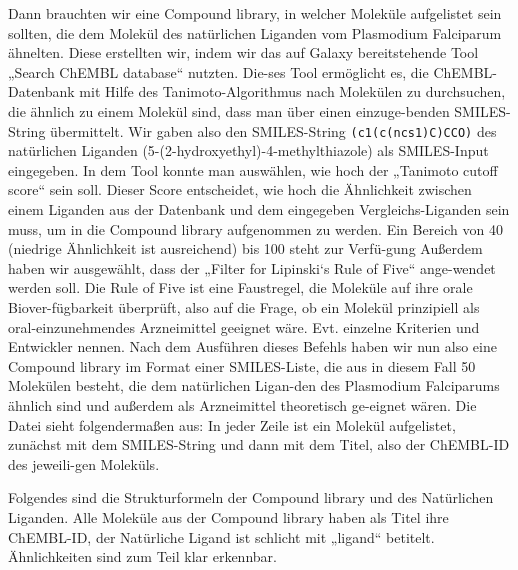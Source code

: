 \documentclass[11pt]{article}
\begin{document}
{    Dann brauchten wir eine Compound library, in welcher Moleküle aufgelistet sein sollten, die dem Molekül des natürlichen Liganden vom Plasmodium Falciparum ähnelten. Diese erstellten wir, indem wir das auf Galaxy bereitstehende Tool „Search ChEMBL database“ nutzten. Die-ses Tool ermöglicht es, die ChEMBL-Datenbank mit Hilfe des Tanimoto-Algorithmus nach Molekülen zu durchsuchen, die ähnlich zu einem Molekül sind, dass man über einen einzuge-benden SMILES-String übermittelt. Wir gaben also den SMILES-String \texttt{(c1(c(ncs1)C)CCO)} des natürlichen Liganden (5-(2-hydroxyethyl)-4-methylthiazole) als SMILES-Input eingegeben.
    In dem Tool konnte man auswählen, wie hoch der „Tanimoto cutoff score“ sein soll. Dieser Score entscheidet, wie hoch die Ähnlichkeit zwischen einem Liganden aus der Datenbank und dem eingegeben Vergleichs-Liganden sein muss, um in die Compound library aufgenommen zu werden. Ein Bereich von 40 (niedrige Ähnlichkeit ist ausreichend) bis 100 steht zur Verfü-gung Außerdem haben wir ausgewählt, dass der „Filter for Lipinski‘s Rule of Five“ ange-wendet werden soll. Die Rule of Five ist eine Faustregel, die Moleküle auf ihre orale Biover-fügbarkeit überprüft, also auf die Frage, ob ein Molekül prinzipiell als oral-einzunehmendes Arzneimittel geeignet wäre.
    Evt. einzelne Kriterien und Entwickler nennen.
    Nach dem Ausführen dieses Befehls haben wir nun also eine Compound library im Format einer SMILES-Liste, die aus in diesem Fall 50 Molekülen besteht, die dem natürlichen Ligan-den des Plasmodium Falciparums ähnlich sind und außerdem als Arzneimittel theoretisch ge-eignet wären. Die Datei sieht folgendermaßen aus: In jeder Zeile ist ein Molekül aufgelistet, zunächst mit dem SMILES-String und dann mit dem Titel, also der ChEMBL-ID des jeweili-gen Moleküls.

        \begin{figure}
            \centering
            \def\svgwidth{\columnwidth}
            \label{fig:figure}
        \end{figure}


        Folgendes sind die Strukturformeln der Compound library und des Natürlichen Liganden. Alle Moleküle aus der Compound library haben als Titel ihre ChEMBL-ID, der Natürliche Ligand ist schlicht mit „ligand“ betitelt. Ähnlichkeiten sind zum Teil klar erkennbar.

}
\end{document}
